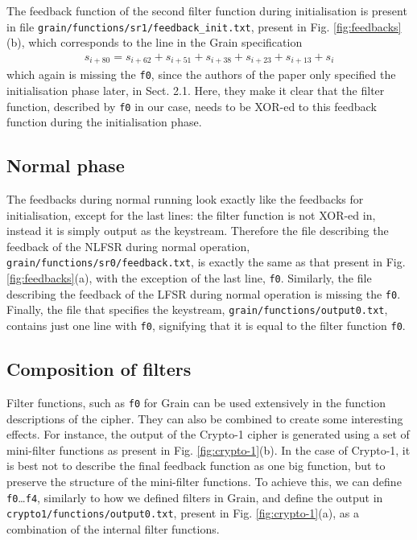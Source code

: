 \documentclass{llncs}
\begin{document}
The feedback function of the second filter function during initialisation is present in file \texttt{grain/functions/sr1/feedback\_init.txt}, present in Fig. \ref{fig:feedbacks}(b), which corresponds to the line in the Grain specification
\begin{align*}
s_{i+80} = s_{i+62} + s_{i+51} + s_{i+38} + s_{i+23} + s_{i+13} + s_i
\end{align*}
which again is missing the \texttt{f0}, since the authors of the paper only specified the initialisation phase later, in Sect. 2.1. Here, they make it clear that the filter function, described by \texttt{f0} in our case, needs to be XOR-ed to this feedback function during the initialisation phase.

\subsection{Normal phase}
The feedbacks during normal running look exactly like the feedbacks for initialisation, except for the last lines: the filter function is not XOR-ed in, instead it is simply output as the keystream. Therefore the file describing the feedback of the NLFSR during normal operation, \texttt{grain/functions/sr0/feedback.txt}, is exactly the same as that present in Fig. \ref{fig:feedbacks}(a), with the exception of the last line, \texttt{f0}. Similarly, the file describing the feedback of the LFSR during normal operation is missing the \texttt{f0}. Finally, the file that specifies the keystream, \texttt{grain/functions/output0.txt}, contains just one line with \texttt{f0}, signifying that it is equal to the filter function \texttt{f0}.

\subsection{Composition of filters}
Filter functions, such as \texttt{f0} for Grain can be used extensively in the function descriptions of the cipher. They can also be combined to create some interesting effects. For instance, the output of the Crypto-1 cipher is generated using a set of mini-filter functions as present in Fig. \ref{fig:crypto-1}(b). In the case of Crypto-1, it is best not to describe the final feedback function as one big function, but to preserve the structure of the mini-filter functions. To achieve this, we can define \texttt{f0}\ldots \texttt{f4}, similarly to how we defined filters in Grain, and define the output in \texttt{crypto1/functions/output0.txt}, present in Fig. \ref{fig:crypto-1}(a), as a combination of the internal filter functions.
\end{document}
